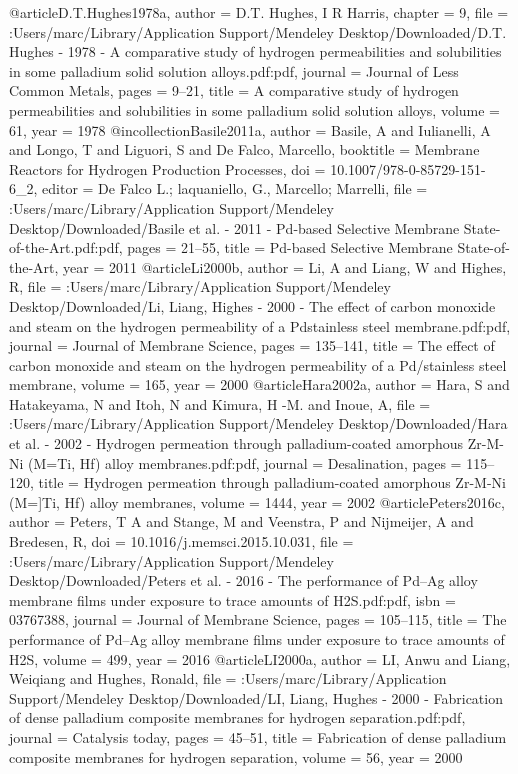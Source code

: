 @article{D.T.Hughes1978a,
author = {{D.T. Hughes}, I R Harris},
chapter = {9},
file = {:Users/marc/Library/Application Support/Mendeley Desktop/Downloaded/D.T. Hughes - 1978 - A comparative study of hydrogen permeabilities and solubilities in some palladium solid solution alloys.pdf:pdf},
journal = {Journal of Less Common Metals},
pages = {9--21},
title = {{A comparative study of hydrogen permeabilities and solubilities in some palladium solid solution alloys}},
volume = {61},
year = {1978}
}
@incollection{Basile2011a,
author = {Basile, A and Iulianelli, A and Longo, T and Liguori, S and {De Falco}, Marcello},
booktitle = {Membrane Reactors for Hydrogen Production Processes},
doi = {10.1007/978-0-85729-151-6_2},
editor = {{De Falco  L.; laquaniello, G.}, Marcello; Marrelli},
file = {:Users/marc/Library/Application Support/Mendeley Desktop/Downloaded/Basile et al. - 2011 - Pd-based Selective Membrane State-of-the-Art.pdf:pdf},
pages = {21--55},
title = {{Pd-based Selective Membrane State-of-the-Art}},
year = {2011}
}
@article{Li2000b,
author = {Li, A and Liang, W and Highes, R},
file = {:Users/marc/Library/Application Support/Mendeley Desktop/Downloaded/Li, Liang, Highes - 2000 - The effect of carbon monoxide and steam on the hydrogen permeability of a Pdstainless steel membrane.pdf:pdf},
journal = {Journal of Membrane Science},
pages = {135--141},
title = {{The effect of carbon monoxide and steam on the hydrogen permeability of a Pd/stainless steel membrane}},
volume = {165},
year = {2000}
}
@article{Hara2002a,
author = {Hara, S and Hatakeyama, N and Itoh, N and Kimura, H -M. and Inoue, A},
file = {:Users/marc/Library/Application Support/Mendeley Desktop/Downloaded/Hara et al. - 2002 - Hydrogen permeation through palladium-coated amorphous Zr-M-Ni (M=Ti, Hf) alloy membranes.pdf:pdf},
journal = {Desalination},
pages = {115--120},
title = {{Hydrogen permeation through palladium-coated amorphous Zr-M-Ni (M=]Ti, Hf) alloy membranes}},
volume = {1444},
year = {2002}
}
@article{Peters2016c,
author = {Peters, T A and Stange, M and Veenstra, P and Nijmeijer, A and Bredesen, R},
doi = {10.1016/j.memsci.2015.10.031},
file = {:Users/marc/Library/Application Support/Mendeley Desktop/Downloaded/Peters et al. - 2016 - The performance of Pd–Ag alloy membrane films under exposure to trace amounts of H2S.pdf:pdf},
isbn = {03767388},
journal = {Journal of Membrane Science},
pages = {105--115},
title = {{The performance of Pd–Ag alloy membrane films under exposure to trace amounts of H2S}},
volume = {499},
year = {2016}
}
@article{LI2000a,
author = {LI, Anwu and Liang, Weiqiang and Hughes, Ronald},
file = {:Users/marc/Library/Application Support/Mendeley Desktop/Downloaded/LI, Liang, Hughes - 2000 - Fabrication of dense palladium composite membranes for hydrogen separation.pdf:pdf},
journal = {Catalysis today},
pages = {45--51},
title = {{Fabrication of dense palladium composite membranes for hydrogen separation}},
volume = {56},
year = {2000}
}
